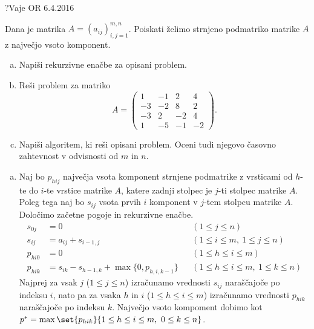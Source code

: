 \begin{naloga}{?}{Vaje OR 6.4.2016}
\begin{vprasanje}
Dana je matrika $A = (a_{ij})_{i,j=1}^{m,n}$.
Poiskati želimo strnjeno podmatriko matrike $A$
z največjo vsoto komponent.
\begin{enumerate}[(a)]
\item Napiši rekurzivne enačbe za opisani problem.
\item Reši problem za matriko
$$
A = \begin{pmatrix}
 1 & -1 &  2 &  4 \\
-3 & -2 &  8 &  2 \\
-3 &  2 & -2 &  4 \\
 1 & -5 & -1 & -2
\end{pmatrix} .
$$
\item Napiši algoritem, ki reši opisani problem.
Oceni tudi njegovo časovno zahtevnost v odvisnosti od $m$ in $n$.
\end{enumerate}
\end{vprasanje}

\begin{odgovor}
\begin{enumerate}[(a)]
\item Naj bo $p_{hij}$ največja vsota komponent strnjene podmatrike
z vrsticami od $h$-te do $i$-te vrstice matrike $A$,
katere zadnji stolpec je $j$-ti stolpec matrike $A$.
Poleg tega naj bo $s_{ij}$ vsota prvih $i$ komponent
v $j$-tem stolpcu matrike $A$.
Določimo začetne pogoje in rekurzivne enačbe.
\begin{align*}
s_{0j}  &= 0 && (1 \le j \le n) \\
s_{ij}  &= a_{ij} + s_{i-1,j} && (1 \le i \le m, \ 1 \le j \le n) \\
p_{hi0} &= 0 && (1 \le h \le i \le m) \\
p_{hik} &= s_{ik} - s_{h-1,k} + \max\{0, p_{h,i,k-1}\} &&
(1 \le h \le i \le m, \ 1 \le k \le n)
\end{align*}
Najprej za vsak $j$ ($1 \le j \le n$)
izračunamo vrednosti $s_{ij}$ naraščajoče po indeksu $i$,
nato pa za vsaka $h$ in $i$ ($1 \le h \le i \le m$)
izračunamo vrednosti $p_{hik}$ naraščajoče po indeksu $k$.
Največjo vsoto kompoment dobimo kot
$p^* = \max\set{p_{hik}}{1 \le h \le i \le m, \ 0 \le k \le n}$.


\end{enumerate}
\end{odgovor}
\end{naloga}

